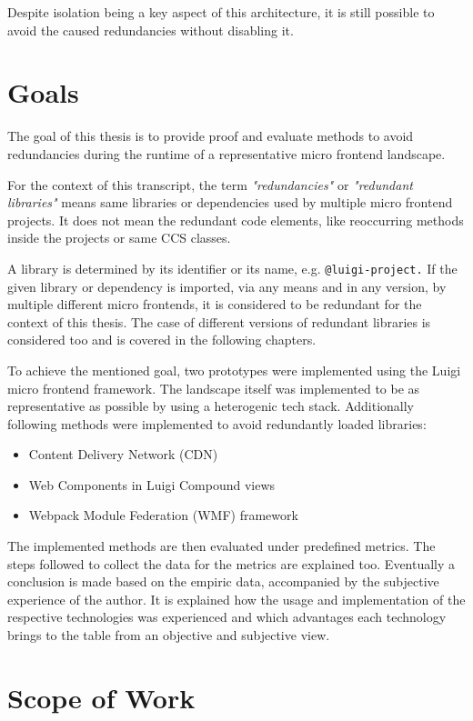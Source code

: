 Despite isolation being a key aspect of this architecture, it is still possible to avoid the caused redundancies without disabling it.

\section{Goals}

The goal of this thesis is to provide proof and evaluate methods to avoid redundancies during the runtime of a representative micro frontend landscape. 

For the context of this transcript, the term \textit{"redundancies"} or \textit{"redundant libraries"} means same libraries or dependencies used by multiple micro frontend projects. It does not mean the redundant code elements, like reoccurring methods inside the projects or same CCS classes. 

A library is determined by its identifier or its name, e.g. \texttt{@luigi-project.} If the given library or dependency is imported, via any means and in any version, by multiple different micro frontends, it is considered to be redundant for the context of this thesis. The case of different versions of redundant libraries is considered too and is covered in the following chapters.

To achieve the mentioned goal, two prototypes were implemented using the Luigi micro frontend framework. The landscape itself was implemented to be as representative as possible by using a heterogenic tech stack. Additionally following methods were implemented to avoid redundantly loaded libraries:

\begin{itemize}
	\item Content Delivery Network (CDN)
	\item Web Components in Luigi Compound views
	\item Webpack Module Federation (WMF) framework
\end{itemize}

The implemented methods are then evaluated under predefined metrics. The steps followed to collect the data for the metrics are explained too.
Eventually a conclusion is made based on the empiric data, accompanied by the subjective experience of the author. It is explained how the usage and implementation of the respective technologies was experienced and which advantages each technology brings to the table from an objective and subjective view.
  
\section{Scope of Work}


